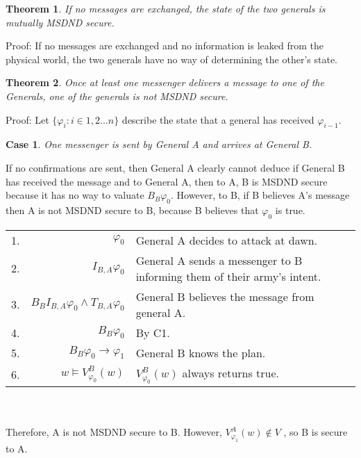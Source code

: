 \documentclass[12pt,oneside]{article}
\newtheorem{thm}{Theorem}
\newtheorem{case}{Case}[thm]
\begin{document}
\begin{thm}
If no messages are exchanged, the state of the two generals is mutually MSDND secure. \label{thm:nomsg}
\end{thm}

Proof: If no messages are exchanged and no information is leaked from the physical world, the two generals have no way of determining the other's state.

\begin{thm}
Once at least one messenger delivers a message to one of the Generals, one of the generals is not MSDND secure.
\end{thm}

Proof:
Let $\{ \varphi_i : i \in 1,2 ... n \}$ describe the state that a general has received $\varphi_{i-1}$.

\begin{case}
One messenger is sent by General A and arrives at General B.
\label{case:generalsn0}
\end{case}

If no confirmations are sent, then General A clearly cannot deduce if General B has received the message and to General A, then to A, B is MSDND secure because it has no way to valuate $B_B \varphi_0$. However, to B, if B believes A's message then A is not MSDND secure to B, because B believes that $\varphi_0$ is true.

\newpage

\begin{table*}[h!]
\centering
\begin{tabular}{r r l}
1. & $\varphi_0$ & General A decides to attack at dawn. \\
2. & $I_{B,A} \varphi_0$ & General A sends a messenger to B informing them of their army's intent. \\
3. & $B_{B}I_{B,A} \varphi_0 \wedge T_{B,A} \varphi_0$ & General B believes the message from general A. \\
4. & $B_{B} \varphi_0$ & By C1. \\
5. & $B_{B} \varphi_0 \rightarrow \varphi_1$ & General B knows the plan. \\
6. & $w \vDash V_{\varphi_0}^{B}(w)$ & $V_{\varphi_0}^{B}(w)$ always returns true. \\
\end{tabular} \\~\\
Therefore, A is not MSDND secure to B. However, $V_{\varphi_1}^{A}(w) \not \in V$ , so B is secure to A.
\label{tab:twoarmiesproof}
\end{table*}
\end{document}
